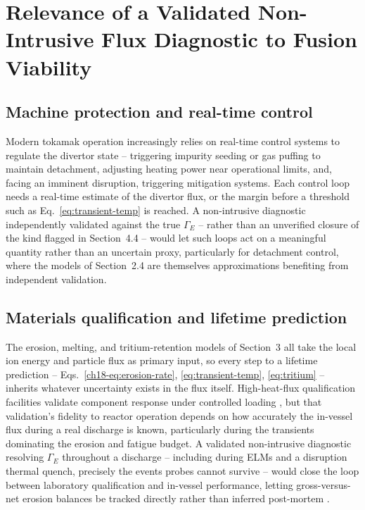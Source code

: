 \section{Relevance of a Validated Non-Intrusive Flux Diagnostic to Fusion Viability}
\label{sec:relevance}

\subsection{Machine protection and real-time control}

Modern tokamak operation increasingly relies on real-time control systems to regulate the divertor state -- triggering impurity seeding or gas puffing to maintain detachment, adjusting heating power near operational limits, and, facing an imminent disruption, triggering mitigation systems. Each control loop needs a real-time estimate of the divertor flux, or the margin before a threshold such as Eq.~\eqref{eq:transient-temp} is reached. A non-intrusive diagnostic independently validated against the true $\Gamma_{E}$ -- rather than an unverified closure of the kind flagged in Section~4.4 -- would let such loops act on a meaningful quantity rather than an uncertain proxy, particularly for detachment control, where the models of Section~2.4 are themselves approximations benefiting from independent validation.

\subsection{Materials qualification and lifetime prediction}

The erosion, melting, and tritium-retention models of Section~3 all take the local ion energy and particle flux as primary input, so every step to a lifetime prediction -- Eqs.~\eqref{ch18-eq:erosion-rate}, \eqref{eq:transient-temp}, \eqref{eq:tritium} -- inherits whatever uncertainty exists in the flux itself. High-heat-flux qualification facilities validate component response under controlled loading \cite{ref0586,ref0588}, but that validation's fidelity to reactor operation depends on how accurately the in-vessel flux during a real discharge is known, particularly during the transients dominating the erosion and fatigue budget. A validated non-intrusive diagnostic resolving $\Gamma_{E}$ throughout a discharge -- including during ELMs and a disruption thermal quench, precisely the events probes cannot survive -- would close the loop between laboratory qualification and in-vessel performance, letting gross-versus-net erosion balances be tracked directly rather than inferred post-mortem \cite{ref0593}.


